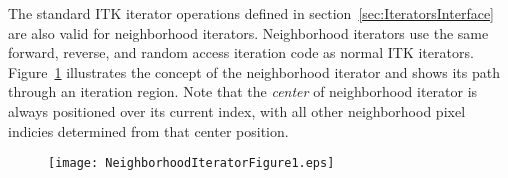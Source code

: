 The standard ITK iterator operations defined in
section~\ref{sec:IteratorsInterface} are also valid for neighborhood iterators.
Neighborhood iterators use the same forward, reverse, and random access
iteration code as normal ITK iterators.
Figure~\ref{fig:WalkingNeighborhoodIterator} illustrates the concept of the
neighborhood iterator and shows its path through an iteration region.  Note
that the \emph{center} of neighborhood iterator is always positioned over its
current index, with all other neighborhood pixel indicies determined from that
center position.

\begin{figure}
\centering
\texttt{[image: NeighborhoodIteratorFigure1.eps]}
\protect\label{fig:WalkingNeighborhoodIterator}
\end{figure}

